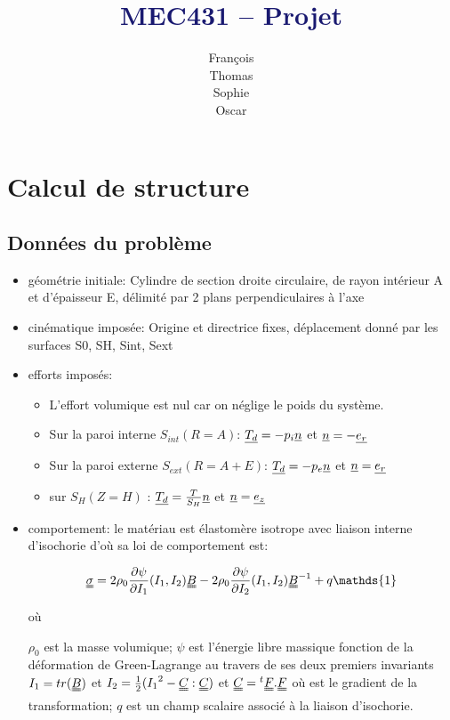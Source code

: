 \documentclass[a4paper,11pt]{article}
\newcommand{\titleinfo}{\textcolor{MidnightBlue}{MEC431 – Projet}}
\newcommand{\tens}{\uuline}
\begin{document}
\title{\titleinfo}
\author{
	François 
	\\
	Thomas 
	\\
	Sophie 
	\\
	Oscar 
}
\date{}
\maketitle

\section{Calcul de structure}

\subsection{Données du problème}

\begin{itemize}
\item géométrie initiale:
Cylindre de section droite circulaire, de rayon intérieur A et d'épaisseur E, délimité par 2 plans perpendiculaires à l'axe
\item cinématique imposée:
Origine et directrice fixes, déplacement donné par les surfaces  S0,  SH, Sint, Sext
\item efforts imposés:
	\begin{itemize}
	\item L'effort volumique est nul car on néglige le poids du système.
	\item Sur la paroi interne $S_{int} (R=A)$:  $\uline{T_d} = -p_i \uline{n}$ et $\uline{n} =- \uline{e_r}$
	\item Sur la paroi externe $S_{ext} (R=A+E)$:  $\uline {T_d} = -p_e \uline{n}$ et $\uline{n} = \uline{e_r}$
	\item sur $S_H (Z=H)$ : $\uline{T_d} = \frac{T}{S_H}\uline{n}$ et $\uline{n} = \uline{e_z}$
	\end{itemize}
\item comportement: le matériau est élastomère isotrope avec liaison interne d'isochorie d'où sa loi de comportement est:
\begin{center}
$$\tens{\sigma}=2\rho_0\frac{\partial\psi}{\partial I_1}(I_1,I_2)\tens{B} -2\rho_0\frac{\partial\psi}{\partial I_2}(I_1,I_2) \tens{B}^{-1}+q\mathds{1}$$
\end{center}
où
\begin{flushleft}
$\rho_0$ est la masse volumique;
$\psi$ est l'énergie libre massique fonction de la déformation de Green-Lagrange \tens{e} au travers de ses deux premiers invariants $I_1= tr(\tens{B})$ et $I_2=\frac{1}{2}({I_1}^2-\tens{C}:\tens{C})$ et $\tens{C} = {}^t\tens{F}.\tens{F}$ où \tens{F} est le gradient de la transformation;
$q$ est un champ scalaire associé à la liaison d'isochorie.
\end{flushleft}
\end{itemize}
\end{document}
